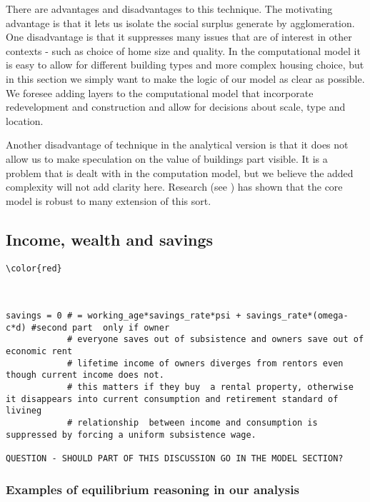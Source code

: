 There are advantages and disadvantages to this technique. The motivating advantage is that it lets us isolate the social surplus generate by agglomeration. One disadvantage is that it suppresses many issues that are of interest in other contexts - such as choice of home size and quality. In the computational model it is easy to allow for different building types and more complex housing choice, but in this section we simply  want to make the logic of our model as clear as possible. We foresee adding layers to the computational model that incorporate redevelopment and construction and allow for decisions about scale, type and location. 

Another disadvantage of technique in the analytical version is that it does not allow us to make speculation on  the value of  buildings part visible. It is a problem that is dealt with in the computation model, but we believe the added complexity will not add clarity here. Research (see \cite{mcdonaldWilliamAlonsoRichard2007}) has shown  that the core model is robust to many extension of this sort. 

\subsection{Income, wealth and savings}
\begin{verbatim}\color{red}



savings = 0 # = working_age*savings_rate*psi + savings_rate*(omega-c*d) #second part  only if owner 
            # everyone saves out of subsistence and owners save out of economic rent 
            # lifetime income of owners diverges from rentors even though current income does not. 
            # this matters if they buy  a rental property, otherwise it disappears into current consumption and retirement standard of livineg
            # relationship  between income and consumption is suppressed by forcing a uniform subsistence wage.

QUESTION - SHOULD PART OF THIS DISCUSSION GO IN THE MODEL SECTION?
\end{verbatim}



\subsubsection{Examples of  \gls{equilibrium reasoning} in our analysis}

